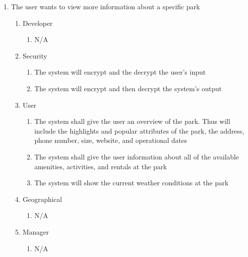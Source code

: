 \documentclass[titlepage]{article}
\begin{document}
\begin{enumerate}[{BE}1.]
    \item The user wants to view more information about a specific park
    \begin{enumerate}[{VP\theenumi}.1]
        \item Developer
            \begin{enumerate}
                \item N/A
            \end{enumerate}
        \item Security
            \begin{enumerate}
                \item The system will encrypt and the decrypt the user's input
                \item The system will encrypt and then decrypt the system's output
            \end{enumerate}
        \item User
            \begin{enumerate}
                \item The system shall give the user an overview of the park. Thus will include the
                highlights and popular attributes of the park, the address, phone number, size,
                website, and operational dates
                \item The system shall give the user information about all of the available
                amenities, activities, and rentals at the park
                \item The system will show the current weather conditions at the park
            \end{enumerate}
        \item Geographical
            \begin{enumerate}
                \item N/A
            \end{enumerate}
        \item Manager
            \begin{enumerate}
                \item N/A
            \end{enumerate}
    \end{enumerate}


\end{enumerate}
\end{document}
